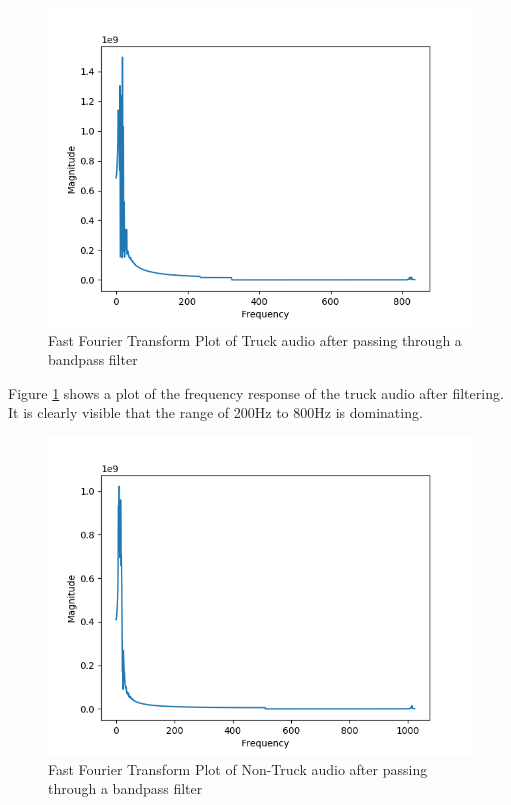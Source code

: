 \documentclass[sigconf, authorversion=false,  screen=true]{acmart}
\begin{document}
	\begin{figure}
		\includegraphics[width=\linewidth]{truck_after_filter}
		\caption{Fast Fourier Transform Plot of Truck audio after passing through a bandpass filter}
		\label{fig:truck_after_filter}
	\end{figure}
	
	Figure \ref{fig:truck_after_filter} shows a plot of the frequency response of the truck audio after filtering. It is clearly visible that the range of 200Hz to 800Hz is dominating.
	
	\begin{figure}
		\includegraphics[width=\linewidth]{no_truck_after_filter}
		\caption{Fast Fourier Transform Plot of Non-Truck audio after passing through a bandpass filter}
		\label{fig:no_truck_after_filter}
	\end{figure}
\end{document}
